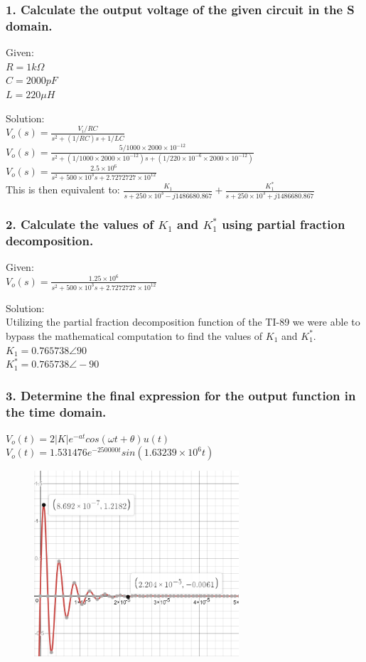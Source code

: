 \documentclass[11pt]{article}
\begin{document}
	\subsubsection*{1. Calculate the output voltage of the given circuit in the S domain.}
	\par{Given:}\\
	$R=1k\Omega$\\
	$C=2000 pF$\\
	$L=220\mu H$
	\par{Solution:}\\
	$V_{o}(s)= \frac{V_{i}/RC}{s^{2}+(1/RC)s+1/LC}$\\
	$V_{o}(s)= \frac{5/1000\times2000\times 10^{-12}}{s^{2}+(1/1000\times2000\times 10^{-12})s+(1/220\times10^{-6}\times2000\times 10^{-12})}$\\
	$V_{o}(s)= \frac{2.5\times10^{6}}{s^{2}+500\times10^{3}s+2.7272727\times10^{12}}$\\
	This is then equivalent to:
	$\frac{K_{1}}{s+250\times 10^{3}-j1486680.867}+\frac{K^{*}_{1}}{s+250\times 10^{3}+j1486680.867}$
	\subsubsection*{2. Calculate the values of $K_{1}$ and $K^{*}_{1}$ using partial fraction decomposition.}
	\par{Given:}\\
	$V_{o}(s)= \frac{1.25\times10^{6}}{s^{2}+500\times10^{3}s+2.7272727\times10^{12}}$\\
	\par{Solution:}\\
	Utilizing the partial fraction decomposition function of the TI-89 we were able to bypass the mathematical computation to find the values of $K_{1}$ and $K^{*}_{1}$.\\
	$K_{1}=0.765738\angle90$\\
	$K^{*}_{1}=0.765738\angle-90$\\
	\subsubsection*{3. Determine the final expression for the output function in the time domain.}
	$V_{o}(t)=2|K|e^{-at}cos(\omega t+\theta)u(t)$\\
	$V_{o}(t)=1.531476e^{-250000t}sin(1.63239\times 10^{6}t)$\\
	\begin{figure}[H]
	\centering
	\includegraphics[width=3in]{images/Function_Graph.png}
	\end{figure}
\end{document}
